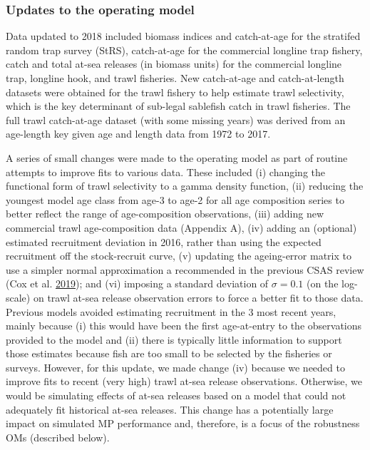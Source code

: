 \documentclass[11pt]{book}
\begin{document}
\hypertarget{updates-to-the-operating-model}{%
\subsubsection{Updates to the operating model}\label{updates-to-the-operating-model}}

Data updated to 2018 included biomass indices and catch-at-age for the stratifed random trap survey (StRS), catch-at-age for the commercial longline trap fishery, catch and total at-sea releases (in biomass units) for the commercial longline trap, longline hook, and trawl fisheries. New catch-at-age and catch-at-length datasets were obtained for the trawl fishery to help estimate trawl selectivity, which is the key determinant of sub-legal sablefish catch in trawl fisheries. The full trawl catch-at-age dataset (with some missing years) was derived from an age-length key given age and length data from 1972 to 2017.

A series of small changes were made to the operating model as part of routine attempts to improve fits to various data. These included (i) changing the functional form of trawl selectivity to a gamma density function, (ii) reducing the youngest model age class from age-3 to age-2 for all age composition series to better reflect the range of age-composition observations, (iii) adding new commercial trawl age-composition data (Appendix A), (iv) adding an (optional) estimated recruitment deviation in 2016, rather than using the expected recruitment off the stock-recruit curve, (v) updating the ageing-error matrix to use a simpler normal approximation a recommended in the previous CSAS review (Cox et al. \protect\hyperlink{ref-cox2019evaluating}{2019}); and (vi) imposing a standard deviation of \(\sigma = 0.1\) (on the log-scale) on trawl at-sea release observation errors to force a better fit to those data. Previous models avoided estimating recruitment in the 3 most recent years, mainly because (i) this would have been the first age-at-entry to the observations provided to the model and (ii) there is typically little information to support those estimates because fish are too small to be selected by the fisheries or surveys. However, for this update, we made change (iv) because we needed to improve fits to recent (very high) trawl at-sea release observations. Otherwise, we would be simulating effects of at-sea releases based on a model that could not adequately fit historical at-sea releases. This change has a potentially large impact on simulated MP performance and, therefore, is a focus of the robustness OMs (described below).
\end{document}
